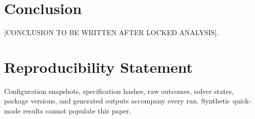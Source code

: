 \documentclass[10pt]{article}
\begin{document}
\section{Conclusion}
[CONCLUSION TO BE WRITTEN AFTER LOCKED ANALYSIS].

\section*{Reproducibility Statement}
Configuration snapshots, specification hashes, raw outcomes, solver states, package versions,
and generated outputs accompany every run. Synthetic quick-mode results cannot populate this paper.



\end{document}

